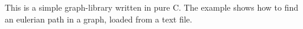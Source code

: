 This is a simple graph-\/library written in pure C. The example shows how to find an eulerian path in a graph, loaded from a text file. 
